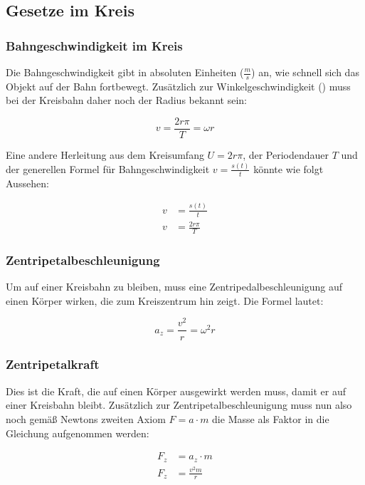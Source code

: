 \subsection{Gesetze im Kreis}

\subsubsection{Bahngeschwindigkeit im Kreis}

Die Bahngeschwindigkeit gibt in absoluten Einheiten ($\frac{m}{s}$) an, wie schnell sich das Objekt auf der Bahn fortbewegt. Zusätzlich zur Winkelgeschwindigkeit () muss bei der Kreisbahn daher noch der Radius bekannt sein:

\begin{equation*} \label{eq:bahngeschwindigkeit}
	v=\frac{2r\pi}{T}=\omega r
\end{equation*}

Eine andere Herleitung aus dem Kreisumfang $U=2r\pi$, der Periodendauer $T$ und der generellen Formel für Bahngeschwindigkeit $v=\frac{s(t)}{t}$ könnte wie folgt Aussehen:

\begin{align*}
	v&=\frac{s(t)}{t} \\
	v&=\frac{2r\pi}{T}
\end{align*}


\subsubsection{Zentripetalbeschleunigung}

Um auf einer Kreisbahn zu bleiben, muss eine Zentripedalbeschleunigung auf einen Körper wirken, die zum Kreiszentrum hin zeigt. Die Formel lautet:

\begin{equation*}
	a_z=\frac{v^2}{r}=\omega^2 r
\end{equation*}


\subsubsection{Zentripetalkraft}

Dies ist die Kraft, die auf einen Körper ausgewirkt werden muss, damit er auf einer Kreisbahn bleibt. Zusätzlich zur Zentripetalbeschleunigung muss nun also noch gemäß Newtons zweiten Axiom $F=a \cdot m$ die Masse als Faktor in die Gleichung aufgenommen werden:

\begin{align*}
	F_z &= a_z \cdot m \\
	F_z &= \frac{v^{2}m}{r}
\end{align*}


